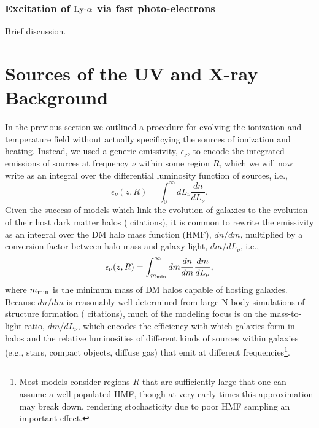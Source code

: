 \subsubsection{Excitation of $\text{Ly-}\alpha$ via fast photo-electrons}
Brief discussion.

\section{Sources of the UV and X-ray Background} \label{sec:sources}
In the previous section we outlined a procedure for evolving the ionization and temperature field without actually specificying the sources of ionization and heating. Instead, we used a generic emissivity, $\epsilon_{\nu}$, to encode the integrated emissions of sources at frequency $\nu$ within some region $R$, which we will now write as an integral over the differential luminosity function of sources, i.e.,
\begin{equation}
	\epsilon_{\nu}(z,R) = \int_0^{\infty} dL_{\nu} \frac{dn}{dL_{\nu}} .
\end{equation}
Given the success of models which link the evolution of galaxies to the evolution of their host dark matter halos ({\color{red} citations}), it is common to rewrite the emissivity as an integral over the DM halo mass function (HMF), $dn/dm$, multiplied by a conversion factor between halo mass and galaxy light, $dm/dL_{\nu}$, i.e.,
\begin{equation}
	\epsilon_{\nu}(z,R) = \int_{m_{\text{min}}}^{\infty} dm \frac{dn}{dm} \frac{dm}{d L_{\nu}} ,
\end{equation}
where $m_{\text{min}}$ is the minimum mass of DM halos capable of hosting galaxies. Because $dn/dm$ is reasonably well-determined from large N-body simulations of structure formation ({\color{red} citations}), much of the modeling focus is on the mass-to-light ratio, $dm/dL_{\nu}$, which encodes the efficiency with which galaxies form in halos and the relative luminosities of different kinds of sources within galaxies (e.g., stars, compact objects, diffuse gas) that emit at different frequencies\footnote{Most models consider regions $R$ that are sufficiently large that one can assume a well-populated HMF, though at very early times this approximation may break down, rendering stochasticity due to poor HMF sampling an important effect.}. 

